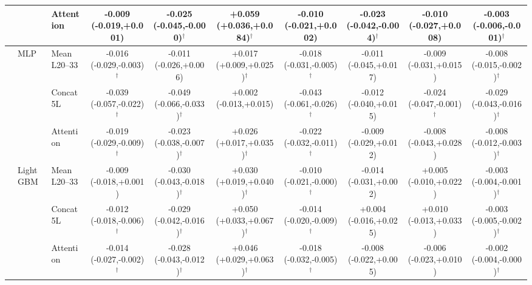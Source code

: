 \documentclass[11pt,a4paper]{article}
\begin{document}
\begin{landscape}
\begin{table}[p]
{\begin{tabular}{lllccccccc}
 &  & Attention & -0.009 (-0.019,+0.001) & -0.025 (-0.045,-0.000)$^{\dagger}$ & +0.059 (+0.036,+0.084)$^{\dagger}$ & -0.010 (-0.021,+0.002) & -0.023 (-0.042,-0.004)$^{\dagger}$ & -0.010 (-0.027,+0.008) & -0.003 (-0.006,-0.001)$^{\dagger}$ \\
\midrule
 & MLP & Mean L20--33 & -0.016 (-0.029,-0.003)$^{\dagger}$ & -0.011 (-0.026,+0.006) & +0.017 (+0.009,+0.025)$^{\dagger}$ & -0.018 (-0.031,-0.005)$^{\dagger}$ & -0.011 (-0.045,+0.017) & -0.009 (-0.031,+0.015) & -0.008 (-0.015,-0.002)$^{\dagger}$ \\
 &  & Concat 5L & -0.039 (-0.057,-0.022)$^{\dagger}$ & -0.049 (-0.066,-0.033)$^{\dagger}$ & +0.002 (-0.013,+0.015) & -0.043 (-0.061,-0.026)$^{\dagger}$ & -0.012 (-0.040,+0.015) & -0.024 (-0.047,-0.001)$^{\dagger}$ & -0.029 (-0.043,-0.016)$^{\dagger}$ \\
 &  & Attention & -0.019 (-0.029,-0.009)$^{\dagger}$ & -0.023 (-0.038,-0.007)$^{\dagger}$ & +0.026 (+0.017,+0.035)$^{\dagger}$ & -0.022 (-0.032,-0.011)$^{\dagger}$ & -0.009 (-0.029,+0.012) & -0.008 (-0.043,+0.028) & -0.008 (-0.012,-0.003)$^{\dagger}$ \\
\midrule
 & LightGBM & Mean L20--33 & -0.009 (-0.018,+0.001) & -0.030 (-0.043,-0.018)$^{\dagger}$ & +0.030 (+0.019,+0.040)$^{\dagger}$ & -0.010 (-0.021,-0.000)$^{\dagger}$ & -0.014 (-0.031,+0.002) & +0.005 (-0.010,+0.022) & -0.003 (-0.004,-0.001)$^{\dagger}$ \\
 &  & Concat 5L & -0.012 (-0.018,-0.006)$^{\dagger}$ & -0.029 (-0.042,-0.016)$^{\dagger}$ & +0.050 (+0.033,+0.067)$^{\dagger}$ & -0.014 (-0.020,-0.009)$^{\dagger}$ & +0.004 (-0.016,+0.025) & +0.010 (-0.013,+0.033) & -0.003 (-0.005,-0.002)$^{\dagger}$ \\
 &  & Attention & -0.014 (-0.027,-0.002)$^{\dagger}$ & -0.028 (-0.043,-0.012)$^{\dagger}$ & +0.046 (+0.029,+0.063)$^{\dagger}$ & -0.018 (-0.032,-0.005)$^{\dagger}$ & -0.008 (-0.022,+0.005) & -0.006 (-0.023,+0.010) & -0.002 (-0.004,-0.000)$^{\dagger}$ \\
\bottomrule
\end{tabular}}\end{table}\end{landscape}
\end{document}
